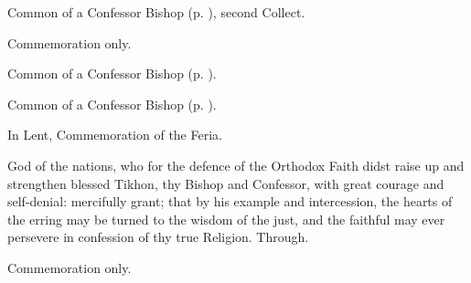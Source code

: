 
\begin{rubric}
	Common of a Confessor Bishop (p. \pageref{CommonConfessorBishop}), second Collect.
\end{rubric}


\clearpage
{}

\begin{rubric}
	Commemoration only.
\end{rubric}

\begin{rubric}
	Common of a Confessor Bishop (p. \pageref{ConfessorBishopDoctorCollect}).
\end{rubric}



\begin{rubric}
	Common of a Confessor Bishop (p. \pageref{CommonConfessorBishop}).
\end{rubric}

\begin{rubric}
    In Lent, Commemoration of the Feria.
\end{rubric}

 God of the nations, who for the defence of the Orthodox Faith didst raise up and strengthen blessed Tikhon, thy Bishop and Confessor, with great courage and self-denial: mercifully grant; that by his example and intercession, the hearts of the erring may be turned to the wisdom of the just, and the faithful may ever persevere in confession of thy true Religion. Through.



\begin{rubric}
	Commemoration only.
\end{rubric}


